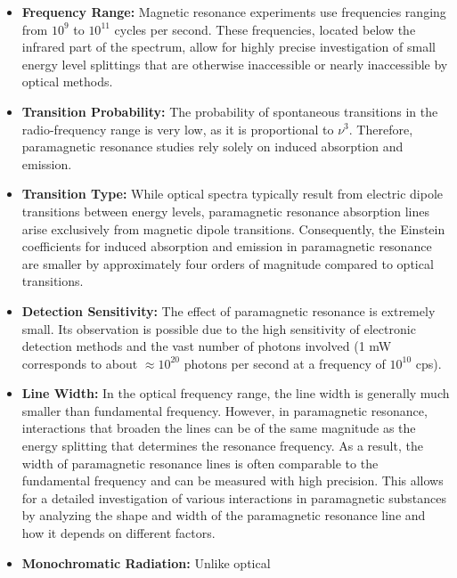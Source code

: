 \begin{itemize}
    \item \textbf{Frequency Range:} Magnetic resonance experiments use frequencies ranging from $10^9$ to
    $10^{11}$ cycles per second. These frequencies,
    located below the infrared part of the spectrum,
    allow for highly precise investigation of small energy level splittings that are otherwise inaccessible or nearly inaccessible by optical methods.\\
    \item \textbf{Transition Probability:} The probability of
    spontaneous transitions in the radio-frequency
    range is very low, as it is proportional to $\nu^3$.
    Therefore, paramagnetic resonance studies rely
    solely on induced absorption and emission.\\
    \item \textbf{Transition Type:} While optical spectra
    typically result from electric dipole transitions
    between energy levels, paramagnetic resonance
    absorption lines arise exclusively from magnetic
    dipole transitions. Consequently, the Einstein
    coefficients for induced absorption and emission
    in paramagnetic resonance are smaller by approximately four orders of magnitude compared
    to optical transitions.\\
    \item \textbf{Detection Sensitivity:} The effect of paramagnetic resonance is extremely small. Its observation is possible due to the high sensitivity of
    electronic detection methods and the vast number of photons involved (1 mW corresponds to
    about $\approx 10^{20}$ photons per second at a frequency
    of $10^{10}$ cps).\\
    \item \textbf{Line Width:} In the optical frequency range, the line width is generally much smaller than fundamental frequency. However, in paramagnetic resonance, interactions that broaden the    
    lines can be of the same magnitude as the energy splitting that determines the resonance frequency. As a result, the width of paramagnetic
    resonance lines is often comparable to the fundamental frequency and can be measured with
    high precision. This allows for a detailed investigation of various interactions in paramagnetic
    substances by analyzing the shape and width
    of the paramagnetic resonance line and how it
    depends on different factors.\\
    \item \textbf{Monochromatic Radiation:} Unlike optical

\end{itemize}
